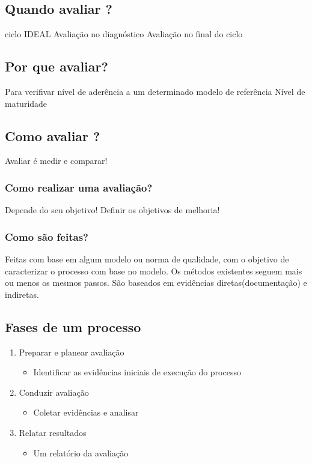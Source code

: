 \documentclass{article}
\begin{document}
\subsection{Quando avaliar ?}
	ciclo IDEAL
	Avaliação no diagnóstico
	Avaliação no final do ciclo
	
\subsection{Por que avaliar?}
	Para verifivar nível de aderência a um determinado modelo de referência
	Nível de maturidade

\subsection{Como avaliar ?}
	Avaliar é medir e comparar!
	\subsubsection{Como realizar uma avaliação?}
		Depende do seu objetivo!
		Definir os objetivos de melhoria!
	\subsubsection{Como são feitas?}
		Feitas com base em algum modelo ou norma de qualidade, com o objetivo de caracterizar o processo com base no modelo.
		Os métodos existentes seguem mais ou menos os mesmos passos.
		São baseados em evidências diretas(documentação) e indiretas.
		
\subsection{Fases de um processo}
	\begin{enumerate}
	
	\item Preparar e planear avaliação
		\begin{itemize}
		\item Identificar as evidências iniciais de execução do processo
		\end{itemize}	
	\item Conduzir avaliação
		\begin{itemize}
		\item Coletar evidências e analisar
		\end{itemize}		
	\item Relatar resultados
		\begin{itemize}
		\item Um relatório da avaliação
		\end{itemize}
	\end{enumerate}
\end{document}
